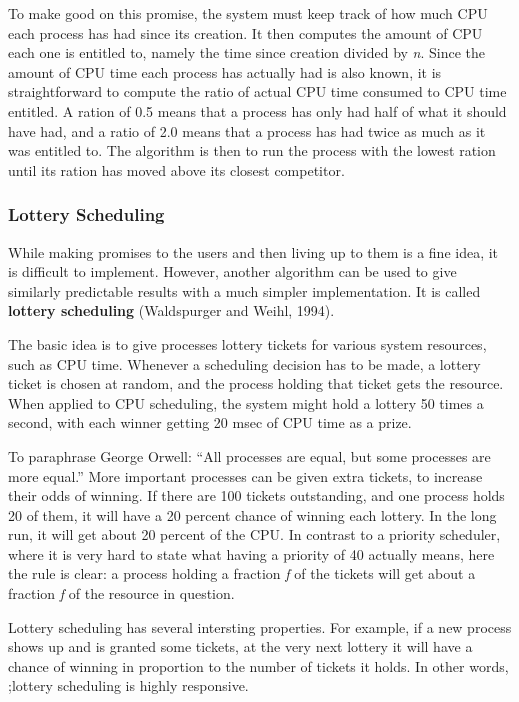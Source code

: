 \documentclass{book}
\newcommand {\kw}  [1] {\textbf{#1}}
\newcommand {\sys} [1] {\textsl{#1}}
\begin{document}
To make good on this promise, the system must keep track of how much CPU each process has had since its creation.
It then computes the amount of CPU each one is entitled to, namely the time since creation divided by \sys{n}.
Since the amount of CPU time each process has actually had is also known, it is straightforward to compute the ratio of actual CPU time consumed to CPU time entitled.
A ration of 0.5 means that a process has only had half of what it should have had,
and a ratio of 2.0 means that a process has had twice as much as it was entitled to.
The algorithm is then to run the process with the lowest ration until its ration has moved above its closest competitor.

\subsubsection*{Lottery Scheduling}
While making promises to the users and then living up to them is a fine idea, it is difficult to implement.
However, another algorithm can be used to give similarly predictable results with a much simpler implementation. 
It is called \kw{lottery scheduling} (Waldspurger and Weihl, 1994).

The basic idea is to give processes lottery tickets for various system resources, such as CPU time.
Whenever a scheduling decision has to be made, a lottery ticket is chosen at random, and the process holding that ticket gets the resource.
When applied to CPU scheduling, the system might hold a lottery 50 times a second, with each winner getting 20 msec of CPU time as a prize.

To paraphrase George Orwell: ``All processes are equal, but some processes are more equal.''
More important processes can be given extra tickets, to increase their odds of winning.
If there are 100 tickets outstanding, and one process holds 20 of them, it will have a 20 percent chance of winning each lottery.
In the long run, it will get about 20 percent of the CPU.
In contrast to a priority scheduler, where it is very hard to state what having a priority of 40 actually means,
here the rule is clear: a process holding a fraction \sys{f} of the tickets will get about a fraction \sys{f} of the resource in question.

Lottery scheduling has several intersting properties.
For example, if a new process shows up and is granted some tickets, at the very next lottery 
it will have a chance of winning in proportion to the number of tickets it holds.
In other words, ;lottery scheduling is highly responsive.
\end{document}
